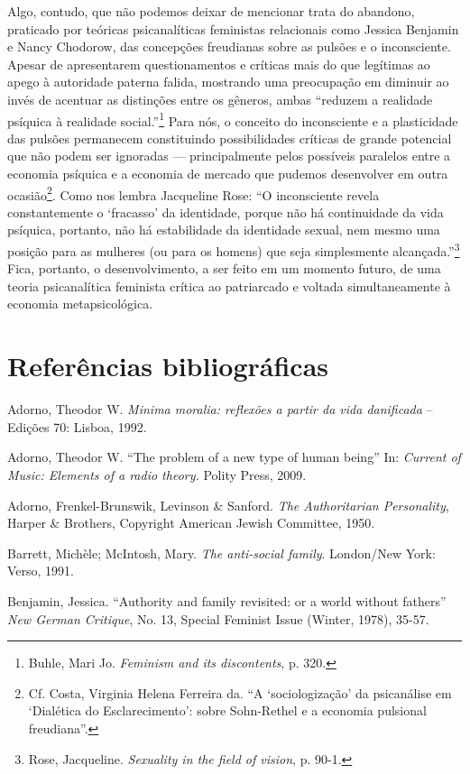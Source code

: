 Algo, contudo, que não podemos deixar de mencionar trata do abandono,
praticado por teóricas psicanalíticas feministas relacionais como
Jessica Benjamin e Nancy Chodorow, das concepções freudianas sobre as
pulsões e o inconsciente. Apesar de apresentarem questionamentos e
críticas mais do que legítimas ao apego à autoridade paterna falida,
mostrando uma preocupação em diminuir ao invés de acentuar as distinções
entre os gêneros, ambas ``reduzem a realidade psíquica à realidade
social.''\footnote{Buhle, Mari Jo. \emph{Feminism and its discontents},
  p. 320.} Para nós, o conceito do inconsciente e a plasticidade das
pulsões permanecem constituindo possibilidades críticas de grande
potencial que não podem ser ignoradas --- principalmente pelos possíveis
paralelos entre a economia psíquica e a economia de mercado que pudemos
desenvolver em outra ocasião\footnote{Cf. Costa, Virginia Helena
  Ferreira da. ``A `sociologização' da psicanálise em `Dialética do
  Esclarecimento': sobre Sohn-Rethel e a economia pulsional freudiana''.}.
Como nos lembra Jacqueline Rose: ``O inconsciente revela constantemente
o `fracasso' da identidade, porque não há continuidade da vida psíquica,
portanto, não há estabilidade da identidade sexual, nem mesmo uma
posição para as mulheres (ou para os homens) que seja simplesmente
alcançada.''\footnote{Rose, Jacqueline. \emph{Sexuality in the field of
  vision}, p. 90-1.} Fica, portanto, o desenvolvimento, a ser feito em
um momento futuro, de uma teoria psicanalítica feminista crítica ao
patriarcado e voltada simultaneamente à economia metapsicológica.

\section{Referências bibliográficas}

Adorno, Theodor W. \emph{Minima
moralia: reflexões a partir da vida danificada} -- Edições 70: Lisboa,
1992.

Adorno, Theodor W. ``The problem of a new type of human being'' In:
\emph{Current of Music: Elements of a radio theory.} Polity Press, 2009.

Adorno, Frenkel-Brunswik, Levinson \& Sanford. \emph{The Authoritarian
Personality}, Harper \& Brothers, Copyright American Jewish Committee,
1950.

Barrett, Michèle; McIntosh, Mary. \emph{The anti-social family}.
London/New York: Verso, 1991.

Benjamin, Jessica. ``Authority and family revisited: or a world
without fathers'' \emph{New German Critique}, No. 13, Special Feminist
Issue (Winter, 1978), 35-57.

